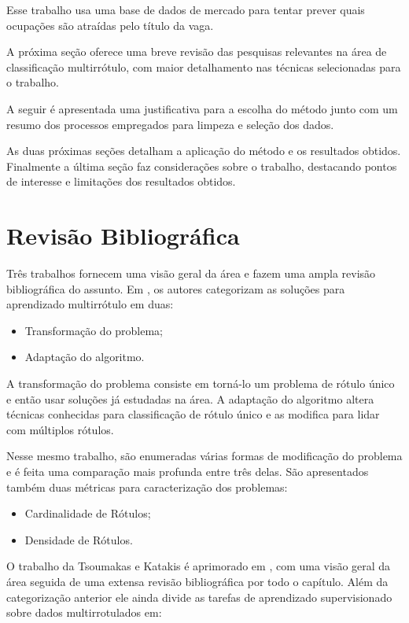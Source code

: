 \documentclass[runningheads,a4paper]{llncs}
\begin{document}
Esse trabalho usa uma base de dados de mercado para tentar prever quais ocupações são atraídas pelo título da vaga.

A próxima seção oferece uma breve revisão das pesquisas relevantes na área de classificação multirrótulo, com maior detalhamento nas técnicas selecionadas para o trabalho.

A seguir é apresentada uma justificativa para a escolha do método junto com um resumo dos processos empregados para limpeza e seleção dos dados.

As duas próximas seções detalham a aplicação do método e os resultados obtidos. Finalmente a última seção faz considerações sobre o trabalho, destacando pontos de interesse e limitações dos resultados obtidos.

\section{Revisão Bibliográfica}\label{sec:revisao}
Três trabalhos fornecem uma visão geral da área e fazem uma ampla revisão bibliográfica do assunto. Em \cite{Tsoumakas2007-cw}, os autores categorizam as soluções para aprendizado multirrótulo em duas:

\begin{itemize}
\item Transformação do problema;
\item Adaptação do algoritmo.
\end{itemize}

A transformação do problema consiste em torná-lo um problema de rótulo único e então usar soluções já estudadas na área. A adaptação do algoritmo altera técnicas conhecidas para classificação de rótulo único e as modifica para lidar com múltiplos rótulos.

Nesse mesmo trabalho, são enumeradas várias formas de modificação do problema e é feita uma comparação mais profunda entre três delas. São apresentados também duas métricas para caracterização dos problemas:

\begin{itemize}
\item Cardinalidade de Rótulos;
\item Densidade de Rótulos.
\end{itemize}

O trabalho da Tsoumakas e Katakis é aprimorado em \cite{Tsoumakas2009-vw}, com uma visão geral da área seguida de uma extensa revisão bibliográfica por todo o capítulo. Além da categorização anterior ele ainda divide as tarefas de aprendizado supervisionado sobre dados multirrotulados em:
\end{document}
